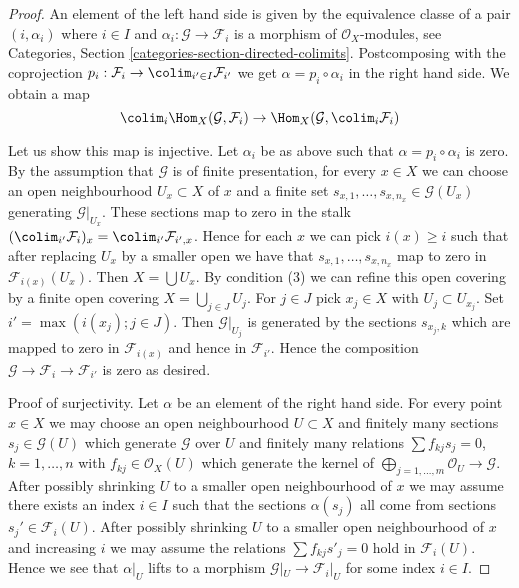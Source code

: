 \begin{proof}
An element of the left hand side is given by the equivalence classe
of a pair $(i, \alpha_i)$ where $i \in I$ and
$\alpha_i : \mathcal{G} \to \mathcal{F}_i$ is a morphism
of $\mathcal{O}_X$-modules, see
Categories, Section \ref{categories-section-directed-colimits}.
Postcomposing with the coprojection
$p_i : \mathcal{F}_i \to \colim_{i' \in I} \mathcal{F}_{i'}$
we get $\alpha = p_i \circ \alpha_i$ in the right hand side.
We obtain a map
$$
\colim_i \Hom_X(\mathcal{G}, \mathcal{F}_i) \to
\Hom_X(\mathcal{G}, \colim_i \mathcal{F}_i)
$$

\medskip\noindent
Let us show this map is injective. Let $\alpha_i$ be as above
such that $\alpha = p_i \circ \alpha_i$ is zero.
By the assumption that $\mathcal{G}$ is of finite presentation,
for every $x \in X$ we can choose an open neighbourhood
$U_x \subset X$ of $x$ and a finite set
$s_{x, 1}, \ldots, s_{x, n_x} \in \mathcal{G}(U_x)$
generating $\mathcal{G}|_{U_x}$. These sections map to
zero in the stalk
$(\colim_{i'} \mathcal{F}_i)_x = \colim_{i'} \mathcal{F}_{i', x}$. Hence
for each $x$ we can pick $i(x) \geq i$ such that after replacing
$U_x$ by a smaller open we have that $s_{x, 1}, \ldots, s_{x, n_x}$
map to zero in $\mathcal{F}_{i(x)}(U_x)$.
Then $X = \bigcup U_x$. By condition (3) we can refine this
open covering by a finite open covering $X = \bigcup_{j \in J} U_j$.
For $j \in J$ pick $x_j \in X$ with $U_j \subset U_{x_j}$.
Set $i' = \max(i(x_j); j \in J)$. Then $\mathcal{G}|_{U_j}$ is generated
by the sections $s_{x_j, k}$ which are mapped to zero in
$\mathcal{F}_{i(x)}$ and hence in $\mathcal{F}_{i'}$.
Hence the composition
$\mathcal{G} \to \mathcal{F}_i \to \mathcal{F}_{i'}$
is zero as desired.

\medskip\noindent
Proof of surjectivity. Let $\alpha$ be an element of the right hand side.
For every point $x \in X$ we may choose an open neighbourhood
$U \subset X$ and finitely many sections
$s_j \in \mathcal{G}(U)$ which generate $\mathcal{G}$ over $U$
and finitely many relations $\sum f_{kj} s_j = 0$, $k = 1, \ldots, n$
with $f_{kj} \in \mathcal{O}_X(U)$ which generate the kernel
of $\bigoplus_{j = 1, \ldots, m} \mathcal{O}_U \to \mathcal{G}$.
After possibly shrinking $U$ to a smaller open neighbourhood of $x$
we may assume there exists an index $i \in I$ such that
the sections $\alpha(s_j)$ all come from sections
$s_j' \in \mathcal{F}_i(U)$.
After possibly shrinking $U$ to a smaller open neighbourhood of $x$
and increasing $i$ we may assume the relations
$\sum f_{kj} s'_j = 0$ hold in $\mathcal{F}_i(U)$.
Hence we see that $\alpha|_U$ lifts to a morphism
$\mathcal{G}|_U \to \mathcal{F}_i|_U$ for some index $i \in I$.


\end{proof}
